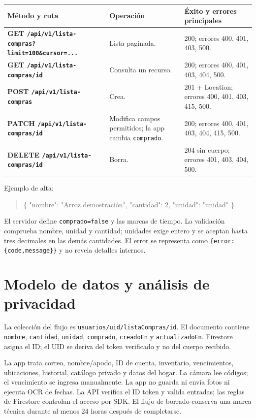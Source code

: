 \documentclass[11pt,a4paper]{article}
\newcommand{\pathcode}[1]{\texttt{\small #1}}
\begin{document}
\begin{tabularx}{\textwidth}{>{\bfseries}p{4.0cm}YY}
Método y ruta & Operación & Éxito y errores principales\\
\midrule
GET \pathcode{/api/v1/lista-compras?limit=100\&cursor=...} & Lista paginada. & 200; errores 400, 401, 403, 500.\\
GET \pathcode{/api/v1/lista-compras/{id}} & Consulta un recurso. & 200; errores 400, 401, 403, 404, 500.\\
POST \pathcode{/api/v1/lista-compras} & Crea. & 201 + Location; errores 400, 401, 403, 415, 500.\\
PATCH \pathcode{/api/v1/lista-compras/{id}} & Modifica campos permitidos; la app cambia \pathcode{comprado}. & 200; errores 400, 401, 403, 404, 415, 500.\\
DELETE \pathcode{/api/v1/lista-compras/{id}} & Borra. & 204 sin cuerpo; errores 401, 403, 404, 500.\\
\end{tabularx}

Ejemplo de alta:
\begin{quote}\ttfamily\small
\{ "nombre": "Arroz demostración", "cantidad": 2, "unidad": "unidad" \}
\end{quote}
El servidor define \pathcode{comprado=false} y las marcas de tiempo. La validación comprueba nombre, unidad y cantidad; unidades exige entero y se aceptan hasta tres decimales en las demás cantidades. El error se representa como \pathcode{\{error:\{code,message\}\}} y no revela detalles internos.

\section{Modelo de datos y análisis de privacidad}
La colección del flujo es \pathcode{usuarios/{uid}/listaCompras/{id}}. El documento contiene \pathcode{nombre}, \pathcode{cantidad}, \pathcode{unidad}, \pathcode{comprado}, \pathcode{creadoEn} y \pathcode{actualizadoEn}. Firestore asigna el ID; el UID se deriva del token verificado y no del cuerpo recibido.

La app trata correo, nombre/apodo, ID de cuenta, inventario, vencimientos, ubicaciones, historial, catálogo privado y datos del hogar. La cámara lee códigos; el vencimiento se ingresa manualmente. La app no guarda ni envía fotos ni ejecuta OCR de fechas. La API verifica el ID token y valida entradas; las reglas de Firestore controlan el acceso por SDK. El flujo de borrado conserva una marca técnica durante al menos 24 horas después de completarse.
\end{document}
